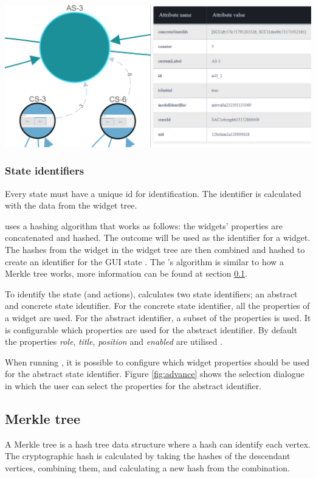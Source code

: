 \bigskip
\begingroup
\captionsetup{type=figure}
\includegraphics[scale=0.5]{images/abstract-model.png}
\label{fig:abstract-model}
\endgroup

\subsubsection{State identifiers} \label{state-identifiers}
Every state must have a unique id for identification. The identifier is calculated with the data from the widget tree. 

\testar uses a hashing algorithm that works as follows: the widgets' properties are concatenated and hashed. The outcome will be used as the identifier for a widget. The hashes from the widget in the widget tree are then combined and hashed to create an identifier for the GUI state \cite{VosAho2021}. The \testar's algorithm is similar to how a Merkle tree works, more information can be found at section \ref{merkle-tree}.

To identify the state (and actions), \testar calculates two state identifiers; an abstract and concrete state identifier. For the concrete state identifier, all the properties of a widget are used. For the abstract identifier, a subset of the properties is used. It is configurable which properties are used for the abstract identifier. By default the properties \textit{role}, \textit{title}, \textit{position} and \textit{enabled} are utilised \cite{VosAho2021, thesisMulders}.

When running \testar, it is possible to configure which widget properties should be used for the abstract state identifier. Figure \ref{fig:advance} shows the selection dialogue in which the user can select the properties for the abstract identifier.

\subsection{Merkle tree} \label{merkle-tree}
A Merkle tree is a hash tree data structure where a hash can identify each vertex. \cite{merkle-tree} The cryptographic hash is calculated by taking the hashes of the descendant vertices, combining them, and calculating a new hash from the combination. 

